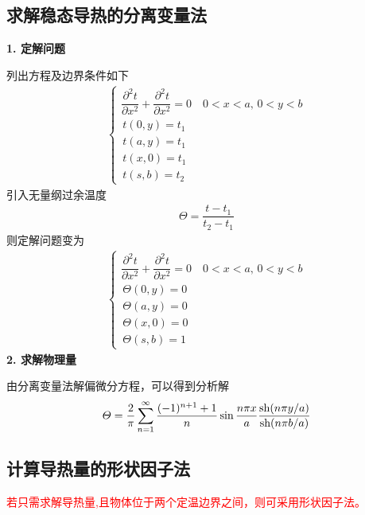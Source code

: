 \subsection{求解稳态导热的分离变量法}

\noindent \textbf{1. 定解问题}

列出方程及边界条件如下
\begin{align}
	\begin{cases}
		\dfrac{\partial^2 t}{\partial x^2} + \dfrac{\partial^2 t}{\partial x^2}  = 0 \quad 0<x<a,\, 0<y<b \\[0.5em]
		\, t(0,y) = t_1\\
		\, t (a, y) = t_1\\
		\, t(x, 0) = t_1\\
		\, t(s,b) = t_2
	\end{cases}
\end{align}
引入无量纲过余温度
\begin{align}
	\varTheta = \dfrac{t - t_1}{t_2 - t_1}
\end{align}
则定解问题变为
\begin{align}
	\begin{cases}
		\dfrac{\partial^2 t}{\partial x^2} + \dfrac{\partial^2 t}{\partial x^2}  = 0 \quad 0<x<a,\, 0<y<b \\[0.5em]
		\, \varTheta(0,y) = 0\\
		\, \varTheta (a, y) = 0\\
		\, \varTheta(x, 0) = 0\\
		\, \varTheta(s,b) = 1
	\end{cases}
\end{align}
\noindent \textbf{2. 求解物理量}

由分离变量法解偏微分方程，可以得到分析解
\begin{align}
	\varTheta = \dfrac{2}{\pi} \sum_{ n =1}^\infty \dfrac{(-1)^{n+1} + 1}{n} \sin \dfrac{n \pi x}{a} \dfrac{\text{sh}(n \pi y /a)}{\text{sh}(n \pi b / a)}
\end{align}

\subsection{计算导热量的形状因子法
}
\textcolor{red}{若只需求解导热量,且物体位于两个定温边界之间，则可采用形状因子法。}

